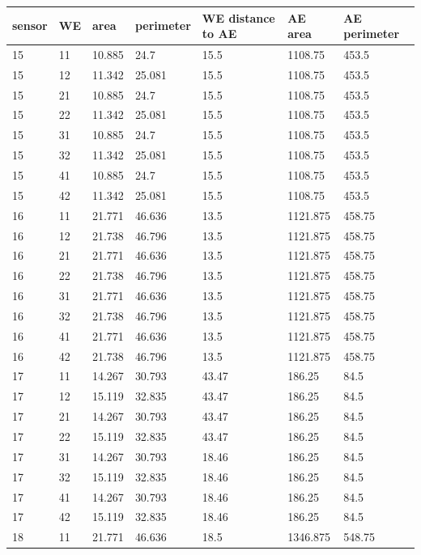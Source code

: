 \begin{table}
	\begin{tabular}{lllllll}
		sensor & WE & area & perimeter & WE distance to AE & AE area & AE perimeter \\
		\hline
		15 & 11 & 10.885 & 24.7 & 15.5 & 1108.75 & 453.5 \\
		15 & 12 & 11.342 & 25.081 & 15.5 & 1108.75 & 453.5 \\
		15 & 21 & 10.885 & 24.7 & 15.5 & 1108.75 & 453.5 \\
		15 & 22 & 11.342 & 25.081 & 15.5 & 1108.75 & 453.5 \\
		15 & 31 & 10.885 & 24.7 & 15.5 & 1108.75 & 453.5 \\
		15 & 32 & 11.342 & 25.081 & 15.5 & 1108.75 & 453.5 \\
		15 & 41 & 10.885 & 24.7 & 15.5 & 1108.75 & 453.5 \\
		15 & 42 & 11.342 & 25.081 & 15.5 & 1108.75 & 453.5 \\
		16 & 11 & 21.771 & 46.636 & 13.5 & 1121.875 & 458.75 \\
		16 & 12 & 21.738 & 46.796 & 13.5 & 1121.875 & 458.75 \\
		16 & 21 & 21.771 & 46.636 & 13.5 & 1121.875 & 458.75 \\
		16 & 22 & 21.738 & 46.796 & 13.5 & 1121.875 & 458.75 \\
		16 & 31 & 21.771 & 46.636 & 13.5 & 1121.875 & 458.75 \\
		16 & 32 & 21.738 & 46.796 & 13.5 & 1121.875 & 458.75 \\
		16 & 41 & 21.771 & 46.636 & 13.5 & 1121.875 & 458.75 \\
		16 & 42 & 21.738 & 46.796 & 13.5 & 1121.875 & 458.75 \\
		17 & 11 & 14.267 & 30.793 & 43.47 & 186.25 & 84.5 \\
		17 & 12 & 15.119 & 32.835 & 43.47 & 186.25 & 84.5 \\
		17 & 21 & 14.267 & 30.793 & 43.47 & 186.25 & 84.5 \\
		17 & 22 & 15.119 & 32.835 & 43.47 & 186.25 & 84.5 \\
		17 & 31 & 14.267 & 30.793 & 18.46 & 186.25 & 84.5 \\
		17 & 32 & 15.119 & 32.835 & 18.46 & 186.25 & 84.5 \\
		17 & 41 & 14.267 & 30.793 & 18.46 & 186.25 & 84.5 \\
		17 & 42 & 15.119 & 32.835 & 18.46 & 186.25 & 84.5 \\
		18 & 11 & 21.771 & 46.636 & 18.5 & 1346.875 & 548.75 \\

\end{tabular}
\end{table}
